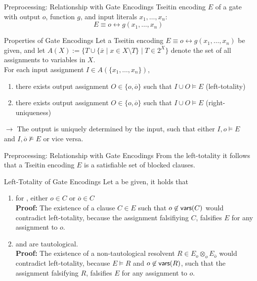 \documentclass[t]{sdqbeamer}
\begin{document}
\begin{frame}{Preprocessing: Relationship with Gate Encodings}
Tseitin encoding $E$ of a gate with output $o$, function $g$, and input literals $x_1, \dots, x_n$: $$E \equiv o \leftrightarrow g(x_1, \dots, x_n)$$ 
\vspace*{-1em}
\begin{block}{Properties of Gate Encodings}
Let a Tseitin encoding $E \equiv o \leftrightarrow g(x_1, \dots, x_n)$ be given, and let $A(X) := \{ T \cup \{ \overline x \mid x \in X \setminus T \} \mid T \in 2^X \}$ denote the set of all assignments to variables in $X$.\\[1ex]
For each input assignment $I \in A(\{x_1, \dots, x_n\})$, \\[1ex]
\begin{enumerate}\setlength{\itemsep}{1ex}
\item there exists  output assignment $O \in \{o, \overline o\}$ such that $I \cup O \models E$ \quad (left-totality)
\item there exists  output assignment $O \in \{o, \overline o\}$ such that $I \cup O \models E$ \quad (right-uniqueness)\\[1ex]
\end{enumerate}
$\bm\rightarrow$ The output is uniquely determined by the input, such that either $I, o \models E$ and $I, \overline o \not\models E$ or vice versa.
\end{block}
\end{frame}


\begin{frame}{Preprocessing: Relationship with Gate Encodings}
From the left-totality it follows that a Tseitin encoding $E$ is a satisfiable set of blocked clauses.\\[1em]
\begin{block}{Left-Totality of Gate Encodings}
Let a  be given, it holds that\\[1em]
\begin{enumerate}\setlength{\itemsep}{1ex}
\item for , either $o \in C$ or $\overline o \in C$\\[1ex]
\textbf{Proof:} The existence of a clause $C \in E$ such that $o \not\in \textsf{vars} (C)$ would contradict left-totality, because the assignment falsifiying $C$, falsifies $E$ for any assignment to $o$.
\item and  are tautological.\\[1ex]
\textbf{Proof:} The existence of a non-tautological resolvent $R \in E_o \otimes_o E_{\overline o}$ would contradict left-totality, because $E \models R$ and $o \not\in \textsf{vars} (R)$, such that the assignment falsifying $R$, falsifies $E$ for any assignment to $o$.
\end{enumerate}
\end{block}
\end{frame}
\end{document}
